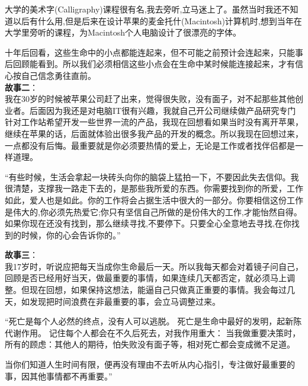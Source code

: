 大学的美术字(Calligraphy)课程很有名,我去旁听,立马迷上了。虽然当时我还不知道以后有什么用,但是后来在设计苹果的麦金托什(Macintosh)计算机时,想到当年在大学里旁听的课程，为Macintosh个人电脑设计了很漂亮的字体。

十年后回看，这些生命中的小点都能连起来，但不可能之前预计会连起来，只能事后回顾能看到。所以我们必须相信这些小点会在生命中某时候能连接起来，才有信心按自己信念勇往直前。\\

\textbf{故事二}：\\
我在30岁的时候被苹果公司赶了出来，觉得很失败，没有面子，对不起那些其他创业者。后面因为我还是对电脑IT很有兴趣，我就自己开公司继续做产品研究专门针对工作站希望开发一些世界一流的产品，我现在回想看如果当时没有离开苹果，继续在苹果的话，后面就体验出很多我产品的开发的概念。所以我现在回想过来，一点都没有后悔。最重要就是你必须要热情的爱上，无论是工作或者找伴侣都是一样道理。

“有些时候，生活会拿起一块砖头向你的脑袋上猛拍一下，不要因此失去信仰。我很清楚，支撑我一路走下去的，是那些我所爱的东西。你需要找到你的所爱，工作如此，爱人也是如此。你的工作将会占据生活中很大的一部分。你要相信这份工作是伟大的,你必须先热爱它;你只有坚信自己所做的是份伟大的工作,才能怡然自得。如果你现在还没有找到，那么继续寻找,不要停下。只要全心全意地去寻找,在你找到的时候，你的心会告诉你的。” 

\textbf{故事三}：\\
我17岁时，听说应把每天当成你生命最后一天。所以我每天都会对着镜子问自己，回顾是否已经用好当天，做最重要的事情，如果连续几天都否定，就必须马上调整。但现在回想，如果保持这想法，能逼自己只做真正重要的事情。我会每过几天，如发现把时间浪费在非最重要的事，会立马调整过来。

``死亡是每个人必然的终点，没有人可以逃脱。
死亡是生命中最好的发明，起新陈代谢作用。
记住每个人都会在不久后死去，对我作用重大：
当我做重要决策时，所有的顾虑：其他人的期待，怕失败没有面子等，相对死亡都会变成微不足道。

当你们知道人生时间有限，便再没有理由不去听从内心指引，专注做好最重要的事，因其他事情都不再重要。''

